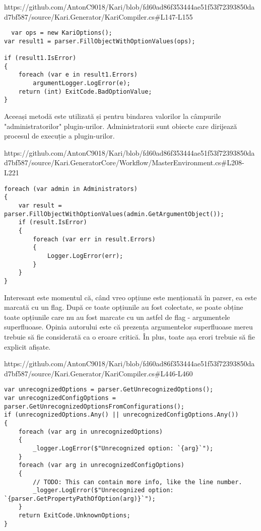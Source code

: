\documentclass{report}
\begin{document}
https://github.com/AntonC9018/Kari/blob/fd60ad86f353444ae51f53f72393850dad7bf587/source/Kari.Generator/KariCompiler.cs#L147-L155

\begin{lstlisting}
  var ops = new KariOptions();
var result1 = parser.FillObjectWithOptionValues(ops);

if (result1.IsError)
{
    foreach (var e in result1.Errors)
        argumentLogger.LogError(e);
    return (int) ExitCode.BadOptionValue;
}
\end{lstlisting}

Aceeași metodă este utilizată și pentru bindarea valorilor la câmpurile "administratorilor" plugin-urilor.
Administratorii sunt obiecte care dirijează procesul de execuție a plugin-urilor.


https://github.com/AntonC9018/Kari/blob/fd60ad86f353444ae51f53f72393850dad7bf587/source/Kari.GeneratorCore/Workflow/MasterEnvironment.cs#L208-L221

\begin{lstlisting}
foreach (var admin in Administrators)
{
    var result = parser.FillObjectWithOptionValues(admin.GetArgumentObject());
    if (result.IsError)
    {
        foreach (var err in result.Errors)
        {
            Logger.LogError(err);
        }
    }
}
\end{lstlisting}

Interesant este momentul că, când vreo opțiune este menționată în parser, ea este marcată cu un flag.
După ce toate opțiunile au fost colectate, se poate obține toate opțiunile care nu au fost marcate cu un astfel de flag - argumentele superfluoase.
Opinia autorului este că prezența argumentelor superfluoase mereu trebuie să fie considerată ca o eroare critică.
În plus, toate așa erori trebuie să fie explicit afișate.

https://github.com/AntonC9018/Kari/blob/fd60ad86f353444ae51f53f72393850dad7bf587/source/Kari.Generator/KariCompiler.cs#L446-L460

\begin{lstlisting}
var unrecognizedOptions = parser.GetUnrecognizedOptions();
var unrecognizedConfigOptions = parser.GetUnrecognizedOptionsFromConfigurations();
if (unrecognizedOptions.Any() || unrecognizedConfigOptions.Any())
{
    foreach (var arg in unrecognizedOptions)
    {
        _logger.LogError($"Unrecognized option: `{arg}`");
    }
    foreach (var arg in unrecognizedConfigOptions)
    {
        // TODO: This can contain more info, like the line number.
        _logger.LogError($"Unrecognized option: `{parser.GetPropertyPathOfOption(arg)}`");
    }
    return ExitCode.UnknownOptions;
}
\end{lstlisting}
\end{document}
